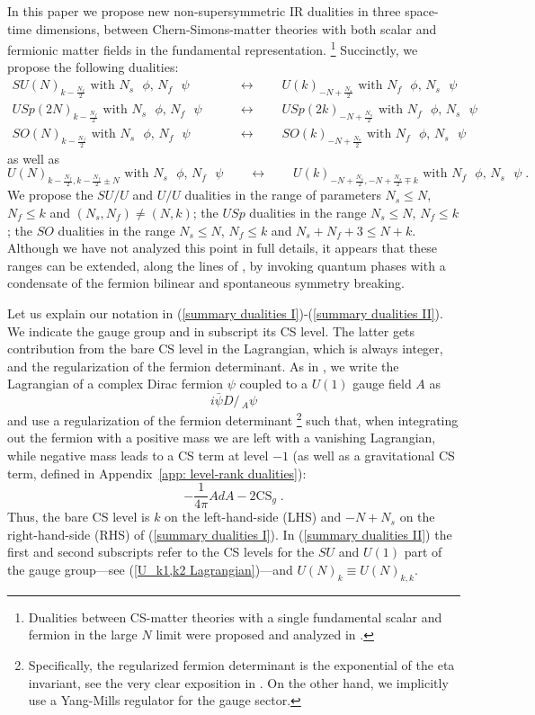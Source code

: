 \documentclass[a4paper, 12pt]{article}
\numberwithin{equation}{section}
\newcommand{\Dslash}{D\!\!\!\!\slash\,}
\newcommand{\be}{\begin{equation}} \newcommand{\ee}{\end{equation}}
\newcommand{\bea}{\begin{equation} \begin{aligned}} \newcommand{\eea}{\end{aligned} \end{equation}}
\begin{document}
In this paper we propose new non-supersymmetric IR dualities in three space-time dimensions, between Chern-Simons-matter theories with both scalar and fermionic matter fields in the fundamental representation.%
\footnote{Dualities between CS-matter theories with a single fundamental scalar and fermion in the large $N$ limit were proposed and analyzed in \cite{Jain:2013gza}.}
Succinctly, we propose the following dualities:
\bea
\label{summary dualities I}
SU(N)_{k-\frac{N_f}2} \text{ with $N_s$ $\phi$, $N_f$ $\psi$} &\qquad\longleftrightarrow\qquad U(k)_{-N + \frac{N_s}2} \text{ with $N_f$ $\phi$, $N_s$ $\psi$} \\
USp(2N)_{k-\frac{N_f}2} \text{ with $N_s$ $\phi$, $N_f$ $\psi$} &\qquad\longleftrightarrow\qquad USp(2k)_{-N + \frac{N_s}2} \text{ with $N_f$ $\phi$, $N_s$ $\psi$} \\
SO(N)_{k-\frac{N_f}2} \text{ with $N_s$ $\phi$, $N_f$ $\psi$} &\qquad\longleftrightarrow\qquad SO(k)_{-N + \frac{N_s}2} \text{ with $N_f$ $\phi$, $N_s$ $\psi$}
\eea
as well as
\be
\label{summary dualities II}
U(N)_{k-\frac{N_f}2, k-\frac{N_f}2 \pm N} \text{ with $N_s$ $\phi$, $N_f$ $\psi$} \qquad\longleftrightarrow\qquad U(k)_{-N + \frac{N_s}2, -N + \frac{N_s}2 \mp k} \text{ with $N_f$ $\phi$, $N_s$ $\psi$} \;.
\ee
We propose the $SU/U$ and $U/U$ dualities in the range of parameters $N_s \leq N$, $N_f \leq k$ and $(N_s, N_f) \neq (N,k)$; the $USp$ dualities in the range $N_s \leq N$, $N_f \leq k$; the $SO$ dualities in the range $N_s \leq N$, $N_f \leq k$ and $N_s + N_f + 3 \leq N+k$. Although we have not analyzed this point in full details, it appears that these ranges can be extended, along the lines of \cite{Komargodski:2017keh}, by invoking quantum phases with a condensate of the fermion bilinear and spontaneous symmetry breaking.

Let us explain our notation in (\ref{summary dualities I})-(\ref{summary dualities II}). We indicate the gauge group and in subscript its CS level. The latter gets contribution from the bare CS level in the Lagrangian, which is always integer, and the regularization of the fermion determinant. As in \cite{Seiberg:2016rsg}, we write the Lagrangian of a complex Dirac fermion $\psi$ coupled to a $U(1)$ gauge field $A$ as
\be
i \bar\psi \Dslash_A \psi
\ee
and use a regularization of the fermion determinant%
\footnote{Specifically, the regularized fermion determinant is the exponential of the eta invariant, see the very clear exposition in \cite{Witten:2015aba}. On the other hand, we implicitly use a Yang-Mills regulator for the gauge sector.}
such that, when integrating out the fermion with a positive mass we are left with a vanishing Lagrangian, while negative mass leads to a CS term at level $-1$ (as well as a gravitational CS term, defined in Appendix~\ref{app: level-rank dualities}):
\be
- \frac1{4\pi} AdA -2 \text{CS}_g \;.
\ee
Thus, the bare CS level is $k$ on the left-hand-side (LHS) and $-N+N_s$ on the right-hand-side (RHS) of (\ref{summary dualities I}). In (\ref{summary dualities II}) the first and second subscripts refer to the CS levels for the $SU$ and $U(1)$ part of the gauge group---see (\ref{U_k1,k2 Lagrangian})---and $U(N)_k \equiv U(N)_{k,k}$.
\end{document}
